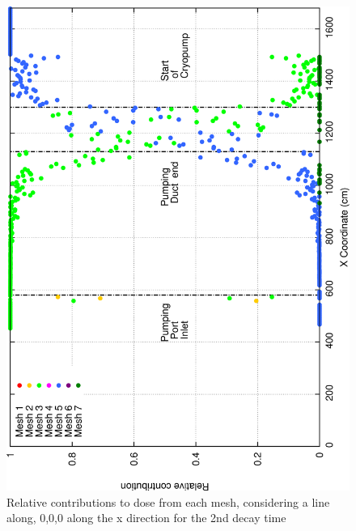 \documentclass[12pt]{article}
\begin{document}
\begin{figure}[ht!]
\centering
\includegraphics[clip,scale=0.25]{../plots/crosstalk/b4c/lp/dc2_rel.png}
\caption{Relative contributions to dose from each mesh, considering a line along, 0,0,0 along the x direction for the 2nd decay time}
\label{fig:b4c_ct_lp_dc2_rel}
\end{figure}
\end{document}
